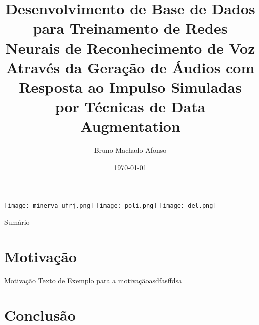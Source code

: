 \documentclass{libs/XJTLU_format}
\title[Defesa de Projeto de Graduação]{\normalsize\textbf{Desenvolvimento de Base de Dados para Treinamento de Redes Neurais de Reconhecimento de Voz
Através da Geração de Áudios com Resposta ao Impulso Simuladas por Técnicas de Data Augmentation}}
\author{Bruno Machado Afonso}
\institute[- Escola Politécnica]{
    \email{bruno.ma@poli.ufrj.br}
    \newline
    \department{\scriptsize Departamento de Engenharia Eletrônica e de Computação - Escola Politécnica}
    \newline
    \university{\scriptsize Universidade Federal do Rio de Janeiro}
}
\date{\today}
\begin{document}


\begin{frame}{}
    \texttt{[image: minerva-ufrj.png]} \hspace{3cm} \vspace{-0.2cm}
    \texttt{[image: poli.png]} \hspace{2cm} \vspace{-0.2cm}
    \texttt{[image: del.png]} \hspace{-0.1cm} \vspace{-0.1cm}
    \maketitle
\end{frame} 

\begin{frame}{Sumário}
    \begin{multicols}{2}
        \tableofcontents
    \end{multicols}
\end{frame}

\section{Motivação}

\begin{frame}{Motivação}
    Texto de Exemplo para a motivaçãoasdfasffdsa
\end{frame}


\section{Conclusão}

\begin{frame}{}
    \centering
    \huge{\textbf{}}    
\end{frame}
\end{document}
